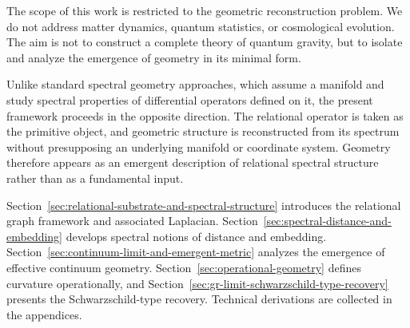   The scope of this work is restricted to the geometric reconstruction problem.
  We do not address matter dynamics, quantum statistics, or cosmological evolution.
  The aim is not to construct a complete theory of quantum gravity,
  but to isolate and analyze the emergence of geometry in its minimal form.

  Unlike standard spectral geometry approaches, which assume a manifold
  and study spectral properties of differential operators defined on it,
  the present framework proceeds in the opposite direction.
  The relational operator is taken as the primitive object, and geometric
  structure is reconstructed from its spectrum without presupposing an
  underlying manifold or coordinate system.
  Geometry therefore appears as an emergent description of relational
  spectral structure rather than as a fundamental input.

  Section~\ref{sec:relational-substrate-and-spectral-structure}
  introduces the relational graph framework and associated Laplacian.
  Section~\ref{sec:spectral-distance-and-embedding}
  develops spectral notions of distance and embedding.
  Section~\ref{sec:continuum-limit-and-emergent-metric}
  analyzes the emergence of effective continuum geometry.
  Section~\ref{sec:operational-geometry}
  defines curvature operationally,
  and Section~\ref{sec:gr-limit-schwarzschild-type-recovery}
  presents the Schwarzschild-type recovery.
  Technical derivations are collected in the appendices.
